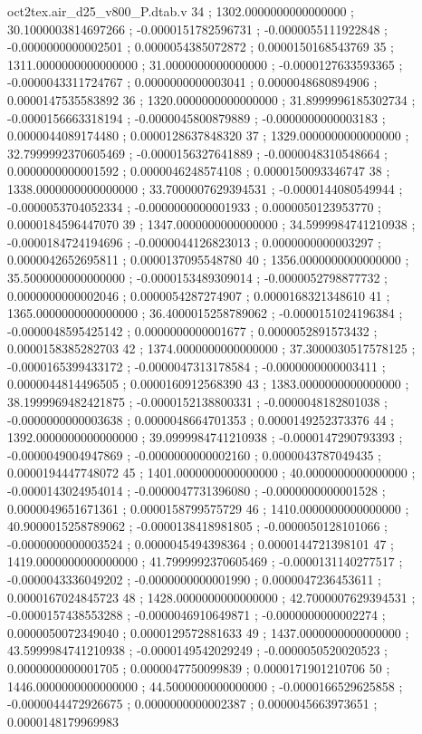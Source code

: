 \begin{filecontents}[overwrite]{oct2tex.air_d25_v800_P.dtab.v}
34 ; 1302.0000000000000000 ; 30.1000003814697266 ; -0.0000151782596731 ; -0.0000055111922848 ; -0.0000000000002501 ; 0.0000054385072872 ; 0.0000150168543769
35 ; 1311.0000000000000000 ; 31.0000000000000000 ; -0.0000127633593365 ; -0.0000043311724767 ; 0.0000000000003041 ; 0.0000048680894906 ; 0.0000147535583892
36 ; 1320.0000000000000000 ; 31.8999996185302734 ; -0.0000156663318194 ; -0.0000045800879889 ; -0.0000000000003183 ; 0.0000044089174480 ; 0.0000128637848320
37 ; 1329.0000000000000000 ; 32.7999992370605469 ; -0.0000156327641889 ; -0.0000048310548664 ; 0.0000000000001592 ; 0.0000046248574108 ; 0.0000150093346747
38 ; 1338.0000000000000000 ; 33.7000007629394531 ; -0.0000144080549944 ; -0.0000053704052334 ; -0.0000000000001933 ; 0.0000050123953770 ; 0.0000184596447070
39 ; 1347.0000000000000000 ; 34.5999984741210938 ; -0.0000184724194696 ; -0.0000044126823013 ; 0.0000000000003297 ; 0.0000042652695811 ; 0.0000137095548780
40 ; 1356.0000000000000000 ; 35.5000000000000000 ; -0.0000153489309014 ; -0.0000052798877732 ; 0.0000000000002046 ; 0.0000054287274907 ; 0.0000168321348610
41 ; 1365.0000000000000000 ; 36.4000015258789062 ; -0.0000151024196384 ; -0.0000048595425142 ; 0.0000000000001677 ; 0.0000052891573432 ; 0.0000158385282703
42 ; 1374.0000000000000000 ; 37.3000030517578125 ; -0.0000165399433172 ; -0.0000047313178584 ; -0.0000000000003411 ; 0.0000044814496505 ; 0.0000160912568390
43 ; 1383.0000000000000000 ; 38.1999969482421875 ; -0.0000152138800331 ; -0.0000048182801038 ; -0.0000000000003638 ; 0.0000048664701353 ; 0.0000149252373376
44 ; 1392.0000000000000000 ; 39.0999984741210938 ; -0.0000147290793393 ; -0.0000049004947869 ; -0.0000000000002160 ; 0.0000043787049435 ; 0.0000194447748072
45 ; 1401.0000000000000000 ; 40.0000000000000000 ; -0.0000143024954014 ; -0.0000047731396080 ; -0.0000000000001528 ; 0.0000049651671361 ; 0.0000158799575729
46 ; 1410.0000000000000000 ; 40.9000015258789062 ; -0.0000138418981805 ; -0.0000050128101066 ; -0.0000000000003524 ; 0.0000045494398364 ; 0.0000144721398101
47 ; 1419.0000000000000000 ; 41.7999992370605469 ; -0.0000131140277517 ; -0.0000043336049202 ; -0.0000000000001990 ; 0.0000047236453611 ; 0.0000167024845723
48 ; 1428.0000000000000000 ; 42.7000007629394531 ; -0.0000157438553288 ; -0.0000046910649871 ; -0.0000000000002274 ; 0.0000050072349040 ; 0.0000129572881633
49 ; 1437.0000000000000000 ; 43.5999984741210938 ; -0.0000149542029249 ; -0.0000050520020523 ; 0.0000000000001705 ; 0.0000047750099839 ; 0.0000171901210706
50 ; 1446.0000000000000000 ; 44.5000000000000000 ; -0.0000166529625858 ; -0.0000044472926675 ; 0.0000000000002387 ; 0.0000045663973651 ; 0.0000148179969983

\end{filecontents}
